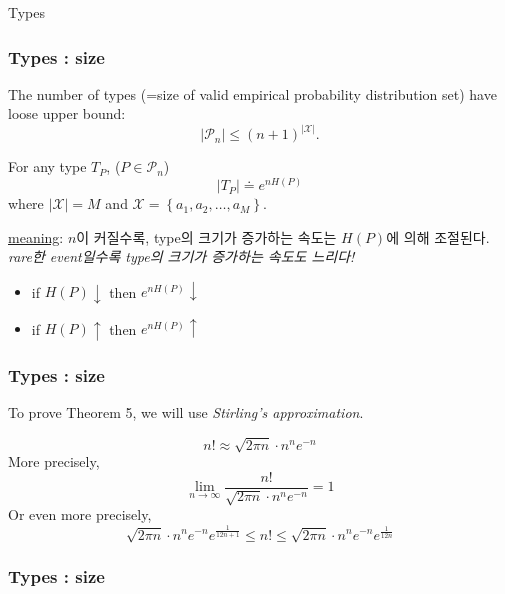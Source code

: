 \documentclass[9pt]{beamer}
\begin{document}
\begin{section}{Types}
\begin{frame}
        \end{frame}


        \begin{frame}
            \frametitle{Types : size}
            \begin{theorem}
                The number of types (=size of valid empirical probability distribution set) have loose upper bound:
                $$ \left|\mathcal{P}_n\right| \leq(n+1)^{|\mathcal X|} . $$
            \end{theorem}
            
            \begin{theorem}
                For any type $T_P$, ($P \in \mathcal P_n$)
                $$  \left|T_P\right|  \doteq e^{n H(P)}  $$
                where $|\mathcal X|=M$ and $\mathcal X=\left\{a_1, a_2, \ldots, a_M\right\}$.
            \end{theorem}

            \vspace{0.2cm}
            \checkmark \underline{meaning}: $n$이 커질수록, type의 크기가 증가하는 속도는 $H(P)$에 의해 조절된다.\\ \textit{rare한 event일수록 type의 크기가 증가하는 속도도 느리다!}
            \begin{itemize}
                \item if $H(P) \downarrow$ then $e^{nH(P)} \downarrow$
                \item if $H(P) \uparrow$ then $e^{nH(P)} \uparrow$
            \end{itemize}
        \end{frame}

        \begin{frame}
            \frametitle{Types : size}
            To prove Theorem 5, we will use \textit{Stirling's approximation}.
            \begin{lemma}
                $$ n!\approx \sqrt{2 \pi n} \cdot n^n e^{-n} $$ 
                More precisely, 
                $$ \lim _{n \rightarrow \infty} \frac{n!}{\sqrt{2 \pi n} \cdot n^n e^{-n}}=1 $$
                Or even more precisely,
                $$ \sqrt{2 \pi n} \cdot n^n e^{-n} e^{\frac{1}{12 n+1}} \leq n!\leq \sqrt{2 \pi n} \cdot n^n e^{-n} e^{\frac{1}{12 n}} $$
            \end{lemma}
        \end{frame}
        
        \begin{frame}
            \frametitle{Types : size}
            

\end{frame}
\end{section}
\end{document}

